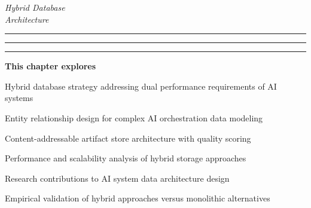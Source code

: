 \begin{center}
{\fontsize{28}{32}\selectfont\textcolor{brandSecondary}{\textit{Hybrid Database}}}\\
\vspace{0.3cm}
{\fontsize{24}{28}\selectfont\textcolor{brandTertiary}{\textit{Architecture}}}
\end{center}

\vspace{0.5cm}

\begin{center}
\textcolor{brandAccent}{
\rule{2cm}{0.8pt} \quad
\raisebox{-0.2ex}{\Large$\circ$} \quad
\rule{4cm}{0.8pt} \quad
\raisebox{-0.2ex}{\Large$\circ$} \quad
\rule{2cm}{0.8pt}
}
\end{center}

\vspace{2cm}

\begin{tcolorbox}[
    enhanced,
    colback=white,
    colframe=brandPrimary!40,
    boxrule=1pt,
    arc=12pt,
    drop shadow={brandPrimary!20},
    left=1.5cm,
    right=1.5cm,
    top=1.2cm,
    bottom=1.2cm,
    before upper={\parindent0pt}
]
\begin{center}
{\Large\textbf{\textcolor{brandPrimary}{This chapter explores}}}
\end{center}

\vspace{0.8cm}

\begin{compactlist}
    \item {\large Hybrid database strategy addressing dual performance requirements of AI systems}
    \item {\large Entity relationship design for complex AI orchestration data modeling}
    \item {\large Content-addressable artifact store architecture with quality scoring}
    \item {\large Performance and scalability analysis of hybrid storage approaches}
    \item {\large Research contributions to AI system data architecture design}
    \item {\large Empirical validation of hybrid approaches versus monolithic alternatives}
\end{compactlist}
\end{tcolorbox}

\clearpage
